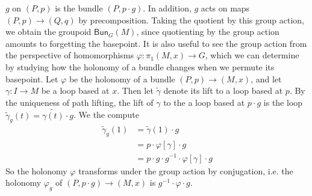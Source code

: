 \documentclass[psamsfonts, 11pt]{amsart}
\theoremstyle{definition}
\theoremstyle{remark}
\newcommand{\Bun}{\mathsf{Bun}}
\newcommand{\inv}{^{-1}}
\begin{document}
$g$ on $(P,p)$ is the bundle $(P, p \cdot g)$. In addition, $g$ acts on maps
$(P,p) \to (Q,q)$ by precomposition. Taking the quotient by this group action,
we obtain the groupoid $\Bun_G(M)$, since quotienting by the group action amounts
to forgetting the basepoint. It is also useful to see the group action from
the perspective of homomorphisms $\varphi : \pi_1(M, x) \to G$, which we can determine
by studying how the holonomy of a bundle changes when we permute its basepoint.
Let $\varphi$ be the holonomy of a bundle $(P,p) \to (M, x)$, and let $\gamma : I \to M$
be a loop based at $x$. Then let $\widetilde{\gamma}$ denote its lift to a loop
based at $p$. By the uniqueness of path lifting, the lift of $\gamma$ to the
a loop based at $p\cdot g$ is the loop
$\widetilde{\gamma}_g(t) = \widetilde{\gamma(t)} \cdot g$. We the compute
%
\begin{align*}
\widetilde{\gamma}_g(1) &= \widetilde{\gamma}(1) \cdot g \\
&= p \cdot \varphi[\gamma] \cdot g \\
&= p \cdot g \cdot g\inv \cdot \varphi[\gamma] \cdot g
\end{align*}
%
So the holonomy $\varphi$ transforms under the group action by conjugation,
i.e. the holonomy $\varphi_g$ of $(P, p\cdot g) \to (M, x)$ is
$g\inv \cdot \varphi \cdot g$. \\
\end{document}
